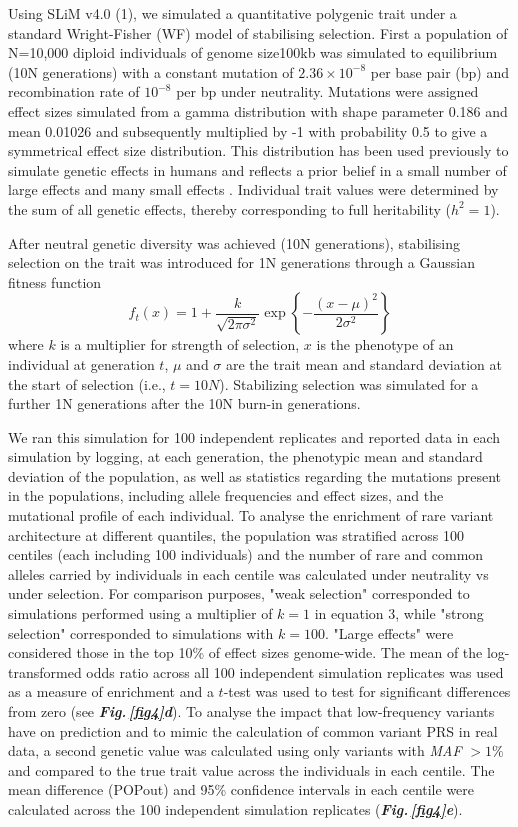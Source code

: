 \documentclass[12pt]{zHenriquesLab-StyleBioRxiv}
\newcommand\dref[2]{\normalsize{\textbf{\textit{Fig.\,\ref{#1}#2}}}\normalsize{}}
\begin{document}
Using SLiM v4.0 (1), we simulated a quantitative polygenic trait under
a standard Wright-Fisher (WF) model of stabilising selection. First a
population of N=10,000 diploid individuals of genome size100kb was simulated to
equilibrium (10N generations) with a constant mutation of
$2.36\times 10^{-8}$ per base pair (bp) and recombination rate of
$10^{-8}$ per bp under neutrality. Mutations were assigned effect
sizes simulated from a gamma distribution with shape parameter 0.186
and mean 0.01026 and subsequently multiplied by -1 with probability
0.5 to give a symmetrical effect size distribution. This distribution
has been used previously to simulate genetic effects in humans and
reflects a prior belief in a small number of large effects and many
small effects \cite{anil3}. Individual trait values were determined by
the sum of all genetic effects, thereby corresponding to full heritability ($h^2 =1$).

After neutral genetic diversity was achieved (10N generations),
stabilising selection on the trait was introduced for 1N
generations through a Gaussian fitness function
\begin{equation} 
  f_t(x) = 1 + \frac{k}{\sqrt{2\pi\sigma^2}} \exp\left\{-\frac{(x-\mu)^2}{2\sigma^2}\right\}
\end{equation}
where $k$ is a multiplier for strength of selection,
$x$ is the phenotype of an individual at generation $t$, $\mu$
and $\sigma$ are the trait mean and standard deviation at the start of
selection (i.e., $t=10N$). Stabilizing selection was simulated for a
further 1N generations after the 10N burn-in generations.

We ran this simulation for 100 independent replicates and reported data in 
each simulation by logging, at each generation, the phenotypic mean and standard 
deviation of the population, as well as statistics regarding the mutations present in the 
populations, including allele frequencies and effect sizes, and the mutational profile of each individual. 
To analyse the enrichment of rare variant architecture at different quantiles, the population 
was stratified across 100 centiles (each including 100 individuals) and the number of rare and common 
alleles carried by individuals in each centile was calculated under neutrality vs under selection.  For comparison 
purposes, "weak selection" corresponded to simulations performed using a multiplier of $k=1$ in equation 3, while "strong selection" corresponded to simulations with $k=100$. "Large effects" were considered those in the top 10\% of effect sizes genome-wide.   
The mean of the log-transformed odds ratio across all 100 independent simulation replicates was used as a measure 
of enrichment and a $t$-test was used to test for significant differences from zero (see \dref{fig4}{d}).  
To analyse the impact that low-frequency variants have on prediction and to mimic the calculation of common 
variant PRS in real data, a second genetic value was calculated using only variants with \emph{MAF} $>1\%$ 
and compared to the true trait value across the individuals in each centile.  The mean difference (POPout) 
and 95\% confidence intervals in each centile were calculated across the 100 independent simulation replicates (\dref{fig4}{e}).
\end{document}
